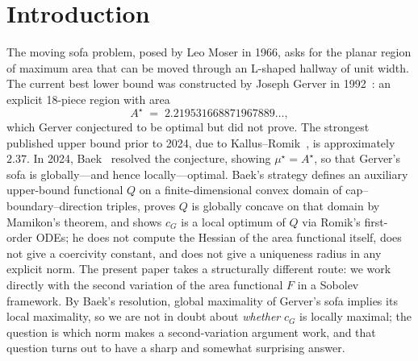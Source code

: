 \documentclass[11pt]{amsart}
\theoremstyle{plain}
\theoremstyle{definition}
\newcommand{\cG}{c_{G}}
\newcommand{\Astar}{A^{\star}}
\begin{document}
\section{Introduction}

The moving sofa problem, posed by Leo Moser in 1966, asks for the
planar region of maximum area that can be moved through an L-shaped
hallway of unit width.  The current best lower bound was constructed
by Joseph Gerver in 1992~\cite{Gerver1992}: an explicit
18-piece region with area
\begin{equation}\label{eq:Astar}
  \Astar \;=\; 2.219531668871967889\ldots,
\end{equation}
which Gerver conjectured to be optimal but did not prove.  The
strongest published upper bound prior to 2024, due to
Kallus--Romik~\cite{KallusRomik2018}, is approximately~$2.37$.  In
2024, Baek~\cite{Baek2024} resolved the conjecture, showing
$\mu^{\star} = \Astar$, so that Gerver's sofa is globally---and hence
locally---optimal.  Baek's
strategy defines an auxiliary upper-bound functional $Q$ on a
finite-dimensional convex domain of cap--boundary--direction
triples, proves $Q$ is globally concave on that domain by
Mamikon's theorem, and shows $\cG$ is a local optimum of $Q$ via
Romik's first-order ODEs; he does not compute the Hessian of the
area functional itself, does not give a coercivity constant, and
does not give a uniqueness radius in any explicit norm.  The
present paper takes a structurally different route: we work
directly with the second variation of the area functional $F$ in
a Sobolev framework.  By Baek's resolution, global maximality of
Gerver's sofa implies its local maximality, so we are not in doubt
about \emph{whether} $\cG$ is locally maximal; the question is
which norm makes a second-variation argument work, and that
question turns out to have a sharp and somewhat surprising answer.
\end{document}
